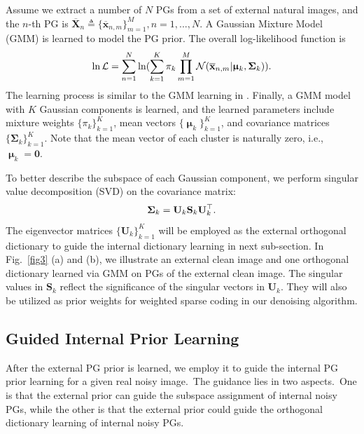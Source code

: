 \documentclass[10pt,twocolumn,letterpaper]{article}
\begin{document}
Assume we extract a number of $N$ PGs from a set of external natural images, and the $n$-th PG is $\mathbf{\overline{X}}_{n}\triangleq \{\mathbf{\overline{x}}_{n,m}\}_{m=1}^{M}, n=1,...,N$. A Gaussian Mixture Model (GMM) is learned to model the PG prior. The overall log-likelihood function is
\vspace{-2mm}
\begin{equation}\label{equ1}\vspace{-2mm}
\begin{split}
\ln\mathcal{L}=\sum_{n=1}^{N} \ln(\sum_{k=1}^{K}\pi_{k}\prod_{m=1}^{M}\mathcal{N}(\mathbf{\overline{x}}_{n,m}|\boldsymbol{\upmu}_{k},\mathbf{\Sigma}_{k})).
\end{split}
\end{equation}
The learning process is similar to the GMM learning in \cite{pgpd,epll}. Finally, a GMM model with $K$ Gaussian components is learned, and the learned parameters include mixture weights $\{\pi_{k}\}_{k=1}^{K}$, mean vectors $\{\boldsymbol{\upmu}_{k}\}_{k=1}^{K}$, and covariance matrices $\{\mathbf{\Sigma}_{k}\}_{k=1}^{K}$. Note that the mean vector of each cluster is naturally zero, i.e., $\boldsymbol{\upmu}_{k}=\mathbf{0}$.  

To better describe the subspace of each Gaussian component, we perform singular value decomposition (SVD) on the covariance matrix:
\vspace{-2mm}
\begin{equation}\label{equ2}\vspace{-2mm}
\mathbf{\Sigma}_{k}=\mathbf{U}_{k}\mathbf{S}_{k}\mathbf{U}_{k}^{\top}.
\end{equation}
The eigenvector matrices $\{\mathbf{U}_{k}\}_{k=1}^{K}$ will be employed as the external orthogonal dictionary to guide the internal dictionary learning in next sub-section. In Fig.\ \ref{fig3} (a) and (b), we illustrate an external clean image and one orthogonal dictionary learned via GMM on PGs of the external clean image. The singular values in $\mathbf{S}_{k}$ reflect the significance of the singular vectors in $\mathbf{U}_{k}$. They  will also be utilized as prior weights for weighted sparse coding in our denoising algorithm.

\subsection{Guided Internal Prior Learning}

After the external PG prior is learned, we employ it to guide the internal PG prior learning for a given real noisy image.\ The guidance lies in two aspects.\ One is that the external prior can guide the subspace assignment of internal noisy PGs, while the other is that the external prior could guide the orthogonal dictionary learning of internal noisy PGs.
\end{document}
